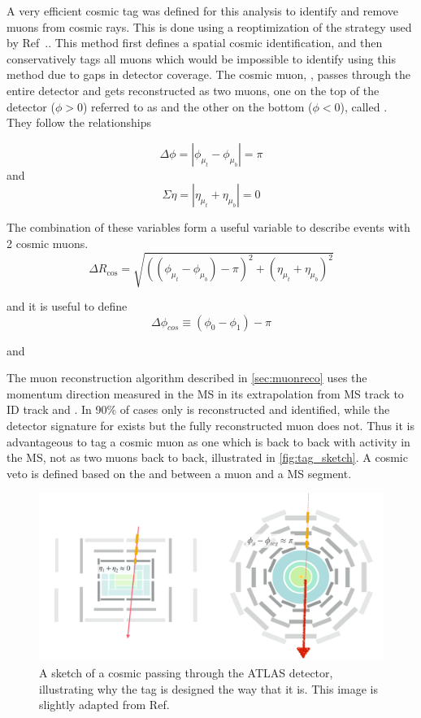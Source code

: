 A very efficient cosmic tag was defined for this analysis to identify and remove muons from cosmic rays. This is done using a reoptimization of the strategy used by Ref~.\cite{dvplusmu}. This method first defines a spatial cosmic identification, and then conservatively tags all muons which would be impossible to identify using this method due to gaps in detector coverage. The cosmic muon, \mcos, passes through the entire detector and gets reconstructed as two muons, one on the top of the detector ($\phi > 0$) referred to as \mt and the other on the bottom ($\phi < 0$), called \mb. They follow the relationships 

\begin{equation}
\Delta \phi = |\phi_{\mu_{t}} - \phi_{\mu_{b}}| = \pi 
\end{equation}
and 
\begin{equation}
\Sigma \eta = |\eta_{\mu_{t}} + \eta_{\mu_{b}}| = 0
\end{equation} 

The combination of these variables form a useful variable to describe events with 2 cosmic muons.
\begin{equation}
\Delta R_{\text{cos}} = \sqrt{ ((\phi_{\mu_{t}} - \phi_{\mu_{b}}) - \pi) ^{2} + (\eta_{\mu_{t}} + \eta_{\mu_{b}})^2}
\end{equation}

and it is useful to define
\begin{equation}
\Delta \phi_{cos} \equiv (\phi_{0} - \phi_{1}) - \pi 
\end{equation}

and 


The muon reconstruction algorithm described in \autoref{sec:muonreco} uses the momentum direction measured in the \ac{MS} in its extrapolation from \ac{MS} track to \ac{ID} track and . In 90\% of cases only \mb is reconstructed and identified, while the detector signature for \mt exists but the fully reconstructed muon does not. Thus it is advantageous to tag a cosmic muon as one which is back to back with activity in the \ac{MS}, not as two muons back to back, illustrated in \autoref{fig:tag_sketch}. A cosmic veto is defined based on the \dphicos and \sigeta between a muon and a \ac{MS} segment. 

\begin{figure}[!ht]
\centering
\includegraphics[width=.8\textwidth]{figures/cosmics/tag_sketch.png}
\caption{A sketch of a cosmic passing through the ATLAS detector, illustrating why the tag is designed the way that it is. This image is slightly adapted from Ref.~\cite{ATLAS-CONF-2019-006}}
\label{fig:tag_sketch}
\end{figure}

